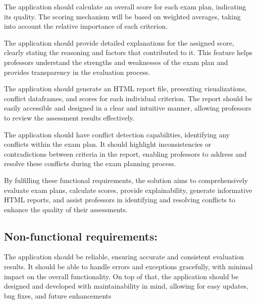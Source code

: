 \vspace{\baselineskip}


The application should calculate an overall score for each exam plan, indicating its quality. The scoring mechanism will be based on weighted averages, taking into account the relative importance of each criterion.

\vspace{\baselineskip}


The application should provide detailed explanations for the assigned score, clearly stating the reasoning and factors that contributed to it. This feature helps professors understand the strengths and weaknesses of the exam plan and provides transparency in the evaluation process.

\vspace{\baselineskip}


The application should generate an HTML report file, presenting visualizations, conflict dataframes, and scores for each individual criterion. The report should be easily accessible and designed in a clear and intuitive manner, allowing professors to review the assessment results effectively.

\vspace{\baselineskip}


The application should have conflict detection capabilities, identifying any conflicts within the exam plan. It should highlight inconsistencies or contradictions between criteria in the report, enabling professors to address and resolve these conflicts during the exam planning process.

\vspace{\baselineskip}


By fulfilling these functional requirements, the solution aims to comprehensively evaluate exam plans, calculate scores, provide explainability, generate informative HTML reports, and assist professors in identifying and resolving conflicts to enhance the quality of their assessments.


\subsection{Non-functional requirements:}


The application should be reliable, ensuring accurate and consistent evaluation results. It should be able to handle errors and exceptions gracefully, with minimal impact on the overall functionality. On top of that, the application should be designed and developed with maintainability in mind, allowing for easy updates, bug fixes, and future enhancements